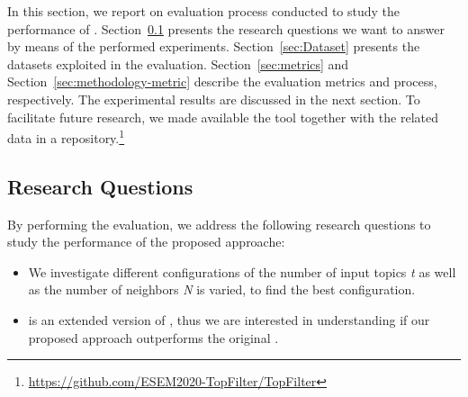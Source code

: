 





In this section, we report on evaluation process conducted to study the performance of \TF. 
Section~\ref{sec:ResearchQuestions} presents the research questions we want to 
answer by means of the performed experiments. Section~\ref{sec:Dataset} 
presents the datasets exploited in the evaluation. 
Section~\ref{sec:metrics} and Section~\ref{sec:methodology-metric} describe the 
evaluation metrics and process, respectively. The experimental results are 
discussed in the next section. To facilitate future research, we made available 
the \TF tool together with the related data in a \GH 
repository.\footnote{\url{https://github.com/ESEM2020-TopFilter/TopFilter}}



\subsection{Research Questions} \label{sec:ResearchQuestions}

By performing the evaluation, we address the following research questions to 
study the performance of the proposed approache:

\begin{itemize}
	\item \rqfirst We investigate different configurations of \TF\ie the 
	number of input topics \emph{t} as well as the number of neighbors \emph{N} 
	is varied, to find the best configuration. %
	
	\item \rqsecond \TFb is an extended version of \MNB, thus we are interested 
	in understanding if our proposed approach outperforms the original \MNB. 
\end{itemize}



